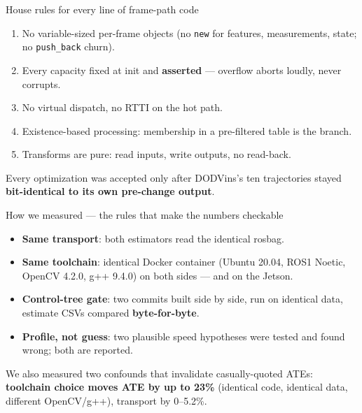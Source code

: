\documentclass[aspectratio=169,11pt]{beamer}
\begin{document}
\begin{frame}{House rules for every line of frame-path code}
  \begin{enumerate}
    \item No variable-sized per-frame objects (no \texttt{new} for features,
          measurements, state; no \texttt{push\_back} churn).
    \item Every capacity fixed at init and \textbf{asserted} --- overflow
          aborts loudly, never corrupts.
    \item No virtual dispatch, no RTTI on the hot path.
    \item Existence-based processing: membership in a pre-filtered table is
          the branch.
    \item Transforms are pure: read inputs, write outputs, no read-back.
  \end{enumerate}
  \vfill
  \small Every optimization was accepted only after DODVins's ten
  trajectories stayed \textbf{bit-identical to its own pre-change output}.
\end{frame}

\begin{frame}{How we measured --- the rules that make the numbers checkable}
  \begin{itemize}
    \item \textbf{Same transport}: both estimators read the identical rosbag.
    \item \textbf{Same toolchain}: identical Docker container (Ubuntu 20.04,
          ROS1 Noetic, OpenCV 4.2.0, g++ 9.4.0) on both sides --- and on the
          Jetson.
    \item \textbf{Control-tree gate}: two commits built side by side, run on
          identical data, estimate CSVs compared \textbf{byte-for-byte}.
    \item \textbf{Profile, not guess}: two plausible speed hypotheses were
          tested and found wrong; both are reported.
  \end{itemize}
  \vfill
  \small We also measured two confounds that invalidate casually-quoted
  ATEs: \textbf{toolchain choice moves ATE by up to 23\%} (identical code,
  identical data, different OpenCV/g++), transport by 0--5.2\%.
\end{frame}
\end{document}
